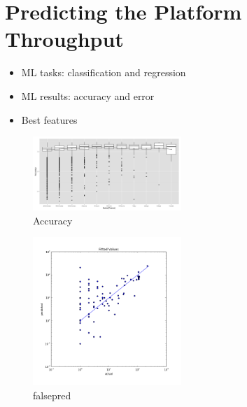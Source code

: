 \section{Predicting the Platform Throughput}\label{sec:Throughput}
\begin{itemize}

	\item ML tasks: classification and regression

	\item ML results: accuracy and error

	\item Best features

\end{itemize}







\begin{figure}[htbp]
	\centering
		\includegraphics[width=0.5\textwidth]{accuracy.png}
	\caption{Accuracy}
	\label{fig:accuracy}
\end{figure}

\begin{figure}[htbp]
	\centering
		\includegraphics[width=0.5\textwidth]{falsepred.png}
	\caption{falsepred}
	\label{fig:falsepred}
\end{figure}


